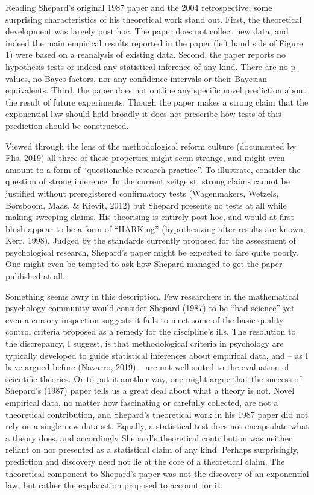 \documentclass[english,doc]{apa6}
\begin{document}
\noindent
Reading Shepard's original 1987 paper and the 2004 retrospective, some surprising characteristics of his theoretical work stand out. First, the theoretical development was largely post hoc. The paper does not collect new data, and indeed the main empirical results reported in the paper (left hand side of Figure 1) were based on a reanalysis of existing data. Second, the paper reports no hypothesis tests or indeed any statistical inference of any kind. There are no p-values, no Bayes factors, nor any confidence intervals or their Bayesian equivalents. Third, the paper does not outline any specific novel prediction about the result of future experiments. Though the paper makes a strong claim that the exponential law should hold broadly it does not prescribe how tests of this prediction should be constructed.

Viewed through the lens of the methodological reform culture (documented by Flis, 2019) all three of these properties might seem strange, and might even amount to a form of \enquote{questionable research practice}. To illustrate, consider the question of strong inference. In the current zeitgeist, strong claims cannot be justified without preregistered confirmatory tests (Wagenmakers, Wetzels, Borsboom, Maas, \& Kievit, 2012) but Shepard presents no tests at all while making sweeping claims. His theorising is entirely post hoc, and would at first blush appear to be a form of \enquote{HARKing} (hypothesizing after results are known; Kerr, 1998). Judged by the standards currently proposed for the assessment of psychological research, Shepard's paper might be expected to fare quite poorly. One might even be tempted to ask how Shepard managed to get the paper published at all.

Something seems awry in this description. Few researchers in the mathematical psychology community would consider Shepard (1987) to be ``bad science'' yet even a cursory inspection suggests it fails to meet some of the basic quality control criteria proposed as a remedy for the discipline's ills. The resolution to the discrepancy, I suggest, is that methodological criteria in psychology are typically developed to guide statistical inferences about empirical data, and -- as I have argued before (Navarro, 2019) -- are not well suited to the evaluation of scientific theories. Or to put it another way, one might argue that the success of Shepard's (1987) paper tells us a great deal about what a theory is not. Novel empirical data, no matter how fascinating or carefully collected, are not a theoretical contribution, and Shepard's theoretical work in his 1987 paper did not rely on a single new data set. Equally, a statistical test does not encapsulate what a theory does, and accordingly Shepard's theoretical contribution was neither reliant on nor presented as a statistical claim of any kind. Perhaps surprisingly, prediction and discovery need not lie at the core of a theoretical claim. The theoretical component to Shepard's paper was not the discovery of an exponential law, but rather the explanation proposed to account for it.
\end{document}
